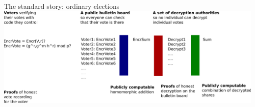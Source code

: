 \documentclass[10pt,xcolor=svgnames,169]{beamer} %
\begin{document}
		\begin{frame}[fragile]{The standard story: ordinary elections}
	\includegraphics[scale=0.17]{e2e-vVoting-homomorphicAddition.png}
\end{frame}

%	
\end{document}
